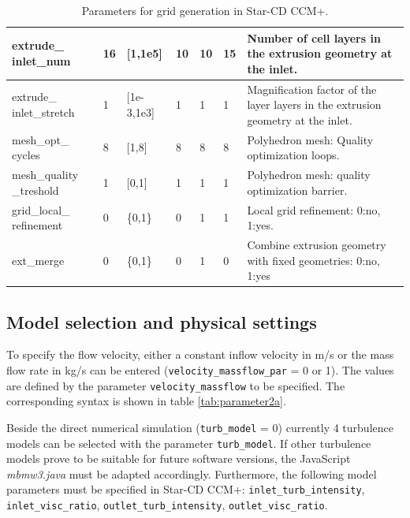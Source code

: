 \documentclass[oneside]{article}
\numberwithin{equation}{section}
\numberwithin{figure}{section}
\numberwithin{figure}{section}
\begin{document}
\begin{table}[h]
\begin{tabular}{|p{2.1cm}|p{1cm}|p{1.5cm}|p{0.6cm}|p{0.5cm}|p{0.5cm}|p{5.6cm}|}
        extrude\_ \qquad \; inlet\_num      & 16 &   [1,1e5]     & 10 & 10 & 15 & Number of cell layers in the extrusion geometry at the inlet.\\
        \hline
        extrude\_ \qquad \; inlet\_stretch  & 1 &    [1e-3,1e3]      & 1 & 1 & 1 & Magnification factor of the layer layers in the extrusion geometry at the inlet.\\
        \hline
        mesh\_opt\_ \quad cycles        & 8 &   [1,8]     & 8 & 8 & 8 & Polyhedron mesh: Quality optimization loops.\\
        \hline
        mesh\_quality \quad \_treshold  &1&   [0,1]     & 1 & 1 & 1 & Polyhedron mesh: quality optimization barrier.\\
        \hline
        grid\_local\_ \qquad refinement  & 0 &  \{0,1\}    & 0 & 1 & 1 & Local grid refinement: 0:no, 1:yes.\\
        \hline
        ext\_merge  & 0 &  \{0,1\}    & 0 & 1 & 0 & Combine extrusion geometry with fixed geometries: 0:no, 1:yes\\
        \hline
    \end{tabular}
    \caption{Parameters for grid generation in Star-CD CCM+.}\label{tab:parameter1}
\end{table}

\subsection{Model selection and physical settings}
To specify the flow velocity, either a constant inflow velocity in m/s or the mass flow rate in kg/s can be entered (\verb|velocity_massflow_par| = 0 or 1). The values are defined by the parameter \verb|velocity_massflow| to be specified. The corresponding syntax is shown in table \ref{tab:parameter2a}.

Beside the direct numerical simulation (\verb|turb_model| = 0) currently 4 turbulence models can be selected with the parameter \verb|turb_model|. If other turbulence models prove to be suitable for future software versions, the JavaScript \textit{mbmw3.java} must be adapted accordingly. Furthermore, the following model parameters must be specified in Star-CD CCM+: \verb|inlet_turb_intensity|, \verb|inlet_visc_ratio|, \verb|outlet_turb_intensity|, \verb|outlet_visc_ratio|.
\end{document}
